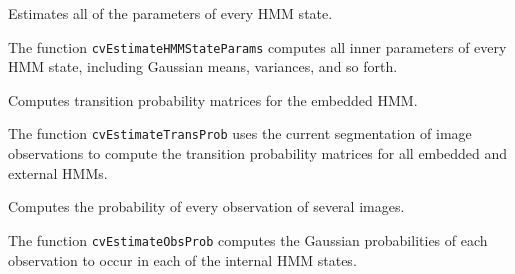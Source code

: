 
Estimates all of the parameters of every HMM state.


\begin{description}
\end{description}

The function \texttt{cvEstimateHMMStateParams} computes all inner parameters of every HMM state, including Gaussian means, variances, and so forth.


Computes transition probability matrices for the embedded HMM.


\begin{description}
\end{description}

The function \texttt{cvEstimateTransProb} uses the current segmentation of image observations to compute the transition probability matrices for all embedded and external HMMs.


Computes the probability of every observation of several images.


\begin{description}
\end{description}

The function \texttt{cvEstimateObsProb} computes the Gaussian probabilities of each observation to occur in each of the internal HMM states.

